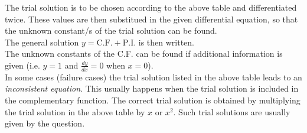 \documentclass{standalone}
\begin{document}
	The trial solution is to be chosen according to the above table and differentiated twice. These values are then substitued in the given differential equation, so that the unknown constant/s of the trial solution can be found.\\
	
	The general solution $y=\text{C.F.} + \text{P.I.}$ is then written.\\
	
	The unknown constants of the C.F. can be found if additional information is given  (i.e. $y=1$ and $\frac{dy}{dx}=0$ when $x=0$).\\
	
	In some cases (failure cases) the trial solution listed in the above table leads to an \textit{inconsistent equation}. This usually happens when the trial solution is included in the complementary function. The correct trial solution is obtained by multiplying the trial solution in the above table by $x$ or $x^2$. Such trial solutions are usually given by the question. 
	
\end{document}
